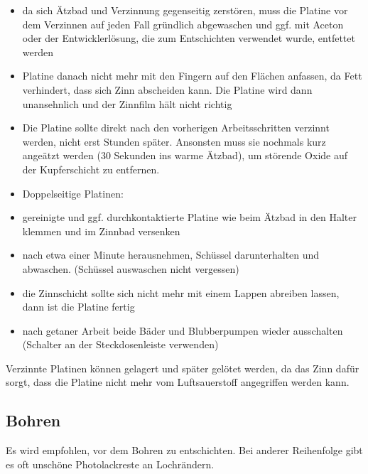 \documentclass{\basedir/fablab-document}
\begin{document}
\begin{itemize}
\item da sich Ätzbad und Verzinnung gegenseitig zerstören, muss die Platine vor dem Verzinnen auf jeden Fall gründlich abgewaschen und ggf. mit Aceton oder der Entwicklerlösung, die zum Entschichten verwendet wurde, entfettet werden
\item Platine danach nicht mehr mit den Fingern auf den Flächen anfassen, da Fett verhindert, dass sich Zinn abscheiden kann. Die Platine wird dann unansehnlich und der Zinnfilm hält nicht richtig
\item Die Platine sollte direkt nach den vorherigen Arbeitsschritten verzinnt werden, nicht erst Stunden später. Ansonsten muss sie nochmals kurz angeätzt werden (30 Sekunden ins warme Ätzbad), um störende Oxide auf der Kupferschicht zu entfernen.
\item Doppelseitige Platinen: 
\item gereinigte und ggf. durchkontaktierte Platine wie beim Ätzbad in den Halter klemmen und im Zinnbad versenken
\item nach etwa einer Minute herausnehmen, Schüssel darunterhalten und abwaschen. (Schüssel auswaschen nicht vergessen)
\item die Zinnschicht sollte sich nicht mehr mit einem Lappen abreiben lassen, dann ist die Platine fertig
\item nach getaner Arbeit beide Bäder und Blubberpumpen wieder ausschalten (Schalter an der Steckdosenleiste verwenden)
\end{itemize}
Verzinnte Platinen können gelagert und später gelötet werden, da das Zinn dafür sorgt, dass die Platine nicht mehr vom Luftsauerstoff angegriffen werden kann.

\subsection{Bohren}
\label{sec:bohren}
Es wird empfohlen, vor dem Bohren zu entschichten. Bei anderer Reihenfolge gibt es oft unschöne Photolackreste an Lochrändern.
\end{document}

